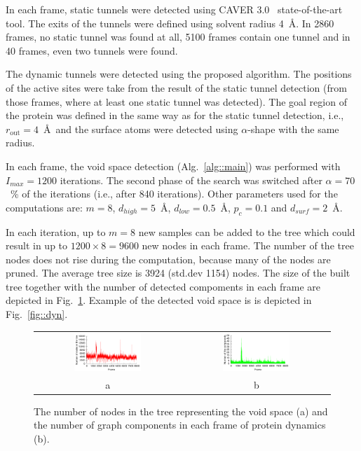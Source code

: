 \documentclass[usletter, 10pt, conference]{svjour3}      %
\def\Imax{I_{max}} %
\def\dts{d_{surf}}
\def\da{d_{high}}
\def\db{d_{low}}
\def\gprobe{r_{\mathrm{out}}}
\def\gb{p_{c}}
\begin{document}
In each frame, static tunnels were detected using CAVER 3.0~\cite{caver3} state-of-the-art tool.
The exits of the tunnels were defined using solvent radius 4~\AA.
In 2860 frames, no static tunnel was found at all, 5100 frames contain one tunnel and in 40 frames, even two tunnels were found.

The dynamic tunnels were detected using the proposed algorithm.
The positions of the active sites were take from the result of the static tunnel detection (from those frames, where at least
one static tunnel was detected).
The goal region of the protein was defined in the same way as for the static tunnel detection, i.e., $\gprobe=4$~\AA\ and 
the surface atoms were detected using $\alpha$-shape with the same radius.

In each frame, the void space detection (Alg.~\ref{alg::main}) was performed with $\Imax=1200$ iterations.
The second phase of the search was switched after $\alpha=70$~\% of the iterations (i.e., after 840 iterations).
Other parameters used for the computations are: $m=8$, $\da=5$~\AA, $\db=0.5$~\AA, $\gb=0.1$ and $\dts=2$~\AA.

In each iteration, up to $m=8$ new samples can be added to the tree which could result in up to 
$1200 \times 8 = 9600$ new nodes in each frame. 
The number of the tree nodes does not rise during the computation, because many of the nodes are pruned.
The average tree size is 3924 (std.dev 1154) nodes.
The size of the built tree together with the number of detected compoments in each frame are depicted in Fig.~\ref{fig::treesize}.
Example of the detected void space is is depicted in Fig.~\ref{fig::dyn}.

\begin{figure}
\centering
{
\renewcommand{\tabcolsep}{0pt}
\begin{tabular}{cc}
\includegraphics[width=0.48\textwidth]{fig/probe14treeSize} &
\includegraphics[width=0.48\textwidth]{fig/probe14components}  \\
a & b  \\
\end{tabular}
}
\caption{\label{fig::treesize}
    The number of nodes in the tree representing the void space (a) and the number of graph components in each frame
        of protein dynamics (b).
}
\end{figure}
\end{document}
